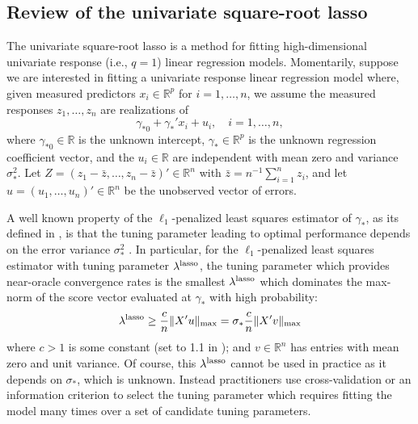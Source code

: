 \documentclass[12pt]{article}
\begin{document}
\subsection{Review of the univariate square-root lasso}
The univariate square-root lasso \citep{belloni2011square} is a method for fitting high-dimensional univariate response (i.e., $q=1$) linear regression models. Momentarily, suppose we are interested in fitting a univariate response linear regression model where, given measured predictors $x_i \in \mathbb{R}^{p}$ for $i=1, \dots, n$, we assume the measured responses $z_1, \dots, z_n$ are realizations of 
$$ \gamma_{*0} + \gamma_*'x_i + u_i, \quad i = 1, \dots, n,$$
where $\gamma_{*0} \in \mathbb{R}$ is the unknown intercept, $\gamma_* \in \mathbb{R}^{p}$ is the unknown regression coefficient vector, and the $u_i \in \mathbb{R}$ are independent with mean zero and variance $\sigma_*^2.$ Let $Z  = (z_1 - \bar{z}, \dots, z_n - \bar{z})' \in \mathbb{R}^n$ with $\bar{z} = n^{-1} \sum_{i=1}^n z_i$, and let $u = (u_1, \dots, u_n)' \in \mathbb{R}^n$ be the unobserved vector of errors. 

A well known property of the $\ell_1$-penalized least squares estimator of $\gamma_*$, as its defined in \citet{bickel2009simultaneous}, is that the tuning parameter leading to optimal performance depends on the error variance $\sigma_*^2$ \citep{bickel2009simultaneous}. In particular, for the $\ell_1$-penalized least squares estimator with tuning parameter $\lambda^{\rm lasso}$, the tuning parameter which provides near-oracle convergence rates is the smallest $\lambda^{\rm lasso}$ which dominates the max-norm of the score vector evaluated at $\gamma_*$ with high probability:
\begin{equation} \label{eq:lassoTP}
\lambda^{\rm lasso} \geq \frac{c}{n}\|X'u\|_{\rm max} = \sigma_* \frac{c}{n}\|X'v\|_{\rm max}
\end{equation}
where $c > 1$ is some constant (set to 1.1 in \citet{belloni2011square}); and $v \in \mathbb{R}^n$ has entries with mean zero and unit variance. Of course, this $\lambda^{\rm lasso}$ cannot be used in practice as it depends on $\sigma_*$, which is unknown. Instead practitioners use cross-validation or an information criterion to select the tuning parameter which requires fitting the model many times over a set of candidate tuning parameters.  
\end{document}
